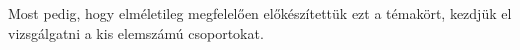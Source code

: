 \documentclass[12pt]{book}
\theoremstyle{plain} %
\theoremstyle{definition} %
\newtheorem{theo/}{Tétel}[section]
\newenvironment{theo}
  {\renewcommand{\qedsymbol}{$\clubsuit$}%
   \pushQED{\qed}\begin{theo/}}
  {\popQED\end{theo/}}
\theoremstyle{remark}
\renewcommand\qedsymbol{$\blacksquare$}
\numberwithin{equation}{section}  %
\def\Z{\mathbb{Z}}
\begin{document}
	Most pedig, hogy elméletileg megfelelően előkészítettük ezt a témakört, kezdjük el vizsgálgatni a kis elemszámú csoportokat.

\end{document}

